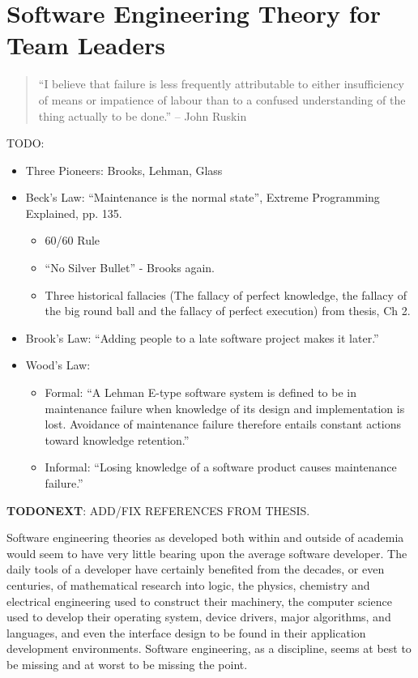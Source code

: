 %
%

\label{ch:SETheory}
\chapter{Software Engineering Theory for Team Leaders}

\begin{quote}
``I believe that failure is less frequently attributable to either
insufficiency of means or impatience of labour than to a confused
understanding of the thing actually to be done.'' -- John Ruskin
\end{quote}


TODO:

\begin{itemize}
\item Three Pioneers: Brooks, Lehman, Glass
\item  Beck's Law: ``Maintenance is the normal state'', Extreme Programming Explained, pp. 135.
\begin{itemize}
	\item 60/60 Rule
	\item ``No Silver Bullet'' - Brooks again.
	\item Three historical fallacies (The fallacy of perfect knowledge, the fallacy of the big round ball and the fallacy of perfect execution) from thesis, Ch 2.
\end{itemize}
\item Brook's Law: ``Adding people to a late software project makes it later.''
\item Wood's Law:
\begin{itemize}
	\item Formal: ``A Lehman E-type software system is defined to be in maintenance failure when knowledge of its design and implementation is lost. Avoidance of maintenance failure therefore entails constant actions toward knowledge retention.''
	\item Informal: ``Losing knowledge of a software product causes maintenance failure.''
\end{itemize}
\end{itemize}

\textbf{TODONEXT}: ADD/FIX REFERENCES FROM THESIS.


Software engineering theories as developed both within and outside of academia would seem to have very little bearing upon the average software developer. The daily tools of a developer have certainly benefited from the decades, or even centuries, of mathematical research into logic, the physics, chemistry and electrical engineering used to construct their machinery, the computer science used to develop their operating system, device drivers, major algorithms, and languages, and even the interface design to be found in their application development environments. Software engineering, as a discipline, seems at best to be missing and at worst to be missing the point.

